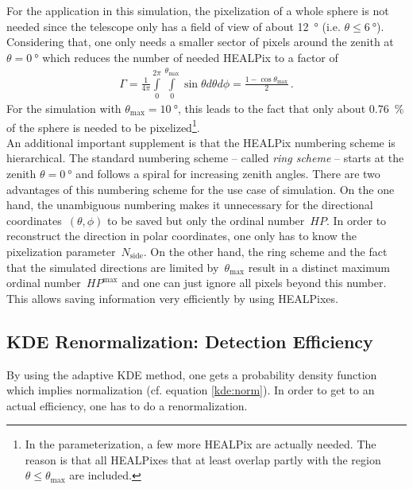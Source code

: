 For the application in this simulation, the pixelization of a whole sphere is not needed since the telescope only has a field of view of about \SI{12}{\degree} (i.e. $\theta \leq \SI{6}{\degree}$). Considering that, one only needs a smaller sector of pixels around the zenith at $\theta = \SI{0}{\degree}$ which reduces the number of needed HEALPix to a factor of
\begin{align}
	\Gamma = \frac{1}{4\pi}\int\limits_{0}^{2\pi}\int\limits_{0}^{\theta_\text{max}}\sin{\theta} d\theta d\phi = \frac{1-\cos\theta_\text{max}}{2}\,.
	\label{eq:spherefactor}
\end{align}
For the \iceact simulation with $\theta_\text{max} = \SI{10}{\degree}$, this leads to the fact that only about \SI{0.76}{\percent} of the sphere is needed to be pixelized\footnote{In the \iceact parameterization, a few more HEALPix are actually needed. The reason is that all HEALPixes that at least overlap partly with the region $\theta\leq\theta_\text{max}$ are included.}.\\

An additional important supplement is that the HEALPix numbering scheme is hierarchical. The standard numbering scheme -- called \textit{ring scheme} -- starts at the zenith $\theta = \SI{0}{\degree}$ and follows a spiral for increasing zenith angles. There are two advantages of this numbering scheme for the use case of \iceact simulation. On the one hand, the unambiguous numbering makes it unnecessary for the directional coordinates~$(\theta, \phi)$ to be saved but only the ordinal number~$HP$. In order to reconstruct the direction in polar coordinates, one only has to know the pixelization parameter~$N_\text{side}$. On the other hand, the ring scheme and the fact that the simulated directions are limited by~$\theta_\text{max}$ result in a distinct maximum ordinal number~$HP^\text{max}$ and one can just ignore all pixels beyond this number. This allows saving information very efficiently by using HEALPixes. 

\subsection{KDE Renormalization: Detection Efficiency}

By using the adaptive KDE method, one gets a probability density function which implies normalization (cf. equation \eqref{kde:norm}). In order to get to an actual efficiency, one has to do a renormalization.\\

